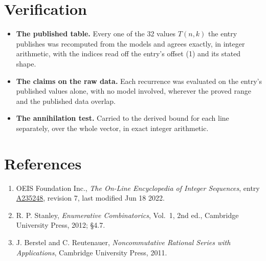 \documentclass[11pt]{article}
\theoremstyle{definition}
\begin{document}
\section{Verification}

\begin{itemize}

\item {\bfseries The published table.} Every one of the 32 values $T(n,k)$ the entry publishes was recomputed from the models and agrees exactly, in integer arithmetic, with the indices read off the entry's offset (1) and its stated shape.

\item {\bfseries The claims on the raw data.} Each recurrence was evaluated on the entry's published values alone, with no model involved, wherever the proved range and the published data overlap.

\item {\bfseries The annihilation test.} Carried to the derived bound for each line separately, over the whole vector, in exact integer arithmetic.

\end{itemize}

\section{References}

\begin{enumerate}

\item OEIS Foundation Inc., \emph{The On-Line Encyclopedia of Integer Sequences}, entry \href{https://oeis.org/A235248}{A235248}, revision 7, last modified Jun 18 2022.

\item R. P. Stanley, \emph{Enumerative Combinatorics}, Vol.~1, 2nd ed., Cambridge University Press, 2012; \S4.7.

\item J. Berstel and C. Reutenauer, \emph{Noncommutative Rational Series with Applications}, Cambridge University Press, 2011.

\end{enumerate}
\end{document}
